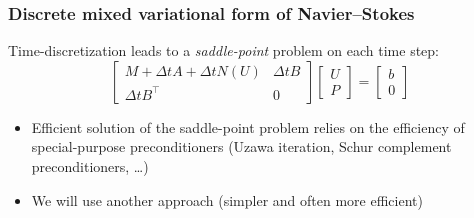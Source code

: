 \begin{frame}
  \frametitle{Discrete mixed variational form of Navier--Stokes}

  Time-discretization leads to a \emph{saddle-point} problem on each time step:
  \begin{equation*}
    \left[
      \begin{array}{cc}
        M + \Delta t A + \Delta t N(U) & \Delta t B \\
        \Delta t B^{\top} & 0
      \end{array}
    \right]
    \left[
      \begin{array}{c}
        U \\ P
      \end{array}
    \right]
    =
    \left[
      \begin{array}{c}
        b\\ 0
      \end{array}
    \right]
  \end{equation*}

  \begin{itemize}
  \item
    Efficient solution of the saddle-point problem relies on the
    efficiency of special-purpose preconditioners (Uzawa iteration,
    Schur complement preconditioners, \ldots)
  \item
    We will use another approach (simpler and often more efficient)
  \end{itemize}

\end{frame}
